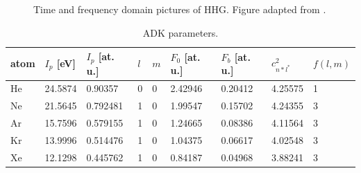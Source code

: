 \begin{figure}
	\centering
	\qquad
	\caption{Time and frequency domain pictures of HHG. Figure adapted from \cite{eichTimeAngleresolvedPhotoemission2014}.}
	\label{fig:APT_IR_field}
\end{figure}

\begin{table}[]
	\centering
	\begin{tabular}{l|l|l|l|l|l|l|l|l}
		atom & $I_p$ {[}eV{]} & $I_p$ {[}at. u.{]} & $l$ & $m$ & $F_0$ {[}at. u.{]} & $F_b$ {[}at. u.{]} & $c_{n*l^*}^2$ & $f(l,m)$ \\ \hline
		He & 24.5874 & 0.90357 & 0 & 0 & 2.42946 & 0.20412 & 4.25575 & 1 \\
		Ne & 21.5645 & 0.792481 & 1 & 0 & 1.99547 & 0.15702 & 4.24355 & 3 \\
		Ar & 15.7596 & 0.579155 & 1 & 0 & 1.24665 & 0.08386 & 4.11564 & 3 \\
		Kr & 13.9996 & 0.514476 & 1 & 0 & 1.04375 & 0.06617 & 4.02548 & 3 \\
		Xe & 12.1298 & 0.445762 & 1 & 0 & 0.84187 & 0.04968 & 3.88241 & 3
	\end{tabular}
	\caption{ADK parameters.}
	\label{tab:ADK-params}
\end{table}

